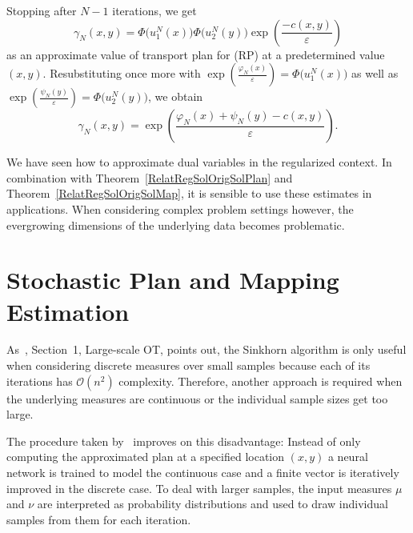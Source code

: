 Stopping after $N - 1$ iterations, we get
\[ \gamma_N(x, y) = \Phi\big( u_1^N(x) \big) \Phi\big( u_2^N(y) \big) \exp\left( \frac{- c(x, y)}{\varepsilon} \right) \]
as an approximate value of transport plan for (RP) at a predetermined value $(x, y)$. Resubstituting once more with $\exp\left( \frac{\varphi_N(x)}{\varepsilon} \right) = \Phi\big( u_1^N(x) \big)$ as well as $\exp\left( \frac{\psi_N(y)}{\varepsilon} \right) = \Phi\big( u_2^N(y) \big)$, we obtain
\begin{equation}\label{RegApprTransPlan}
	\gamma_N(x, y) = \exp\left( \frac{\varphi_N(x) + \psi_N(y) - c(x, y)}{\varepsilon} \right).
\end{equation}

We have seen how to approximate dual variables in the regularized context. In combination with Theorem~\ref{RelatRegSolOrigSolPlan} and Theorem~\ref{RelatRegSolOrigSolMap}, it is sensible to use these estimates in applications. When considering complex problem settings however, the evergrowing dimensions of the underlying data becomes problematic.


\section{Stochastic Plan and Mapping Estimation}\label{StoPlanAndMapEst}


As~\cite{Seg2018}, Section~1, Large-scale OT, points out, the Sinkhorn algorithm is only useful when considering discrete measures over small samples because each of its iterations has $\mathcal{O}(n^2)$ complexity. Therefore, another approach is required when the underlying measures are continuous or the individual sample sizes get too large.

The procedure taken by~\cite{Seg2018} improves on this disadvantage: Instead of only computing the approximated plan at a specified location $(x, y)$ a neural network is trained to model the continuous case and a finite vector is iteratively improved in the discrete case. To deal with larger samples, the input measures $\mu$ and $\nu$ are interpreted as probability distributions and used to draw individual samples from them for each iteration.

